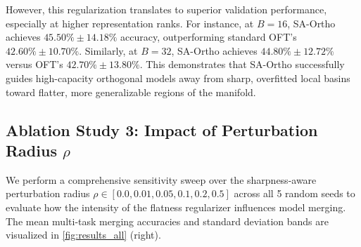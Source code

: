 \documentclass{article}
\theoremstyle{plain}
\theoremstyle{definition}
\theoremstyle{remark}
\begin{document}
However, this regularization translates to superior validation performance, especially at higher representation ranks. For instance, at $B=16$, SA-Ortho achieves $45.50\% \pm 14.18\%$ accuracy, outperforming standard OFT's $42.60\% \pm 10.70\%$. Similarly, at $B=32$, SA-Ortho achieves $44.80\% \pm 12.72\%$ versus OFT's $42.70\% \pm 13.80\%$. This demonstrates that SA-Ortho successfully guides high-capacity orthogonal models away from sharp, overfitted local basins toward flatter, more generalizable regions of the manifold.

\begin{table}[t]
  \caption{Comparative analysis of block size $B$ on Task 1 downstream adaptation across 5 random seeds. We report the mean final training loss and validation accuracy (Mean $\pm$ Std) for both standard Orthogonal Fine-Tuning (OFT) and our Sharpness-Aware Orthogonal (SA-Ortho) method.}
  \label{tab:block_size}
  \centering
\end{table}
\vspace{-12pt}

\subsection{Ablation Study 3: Impact of Perturbation Radius $\rho$}
We perform a comprehensive sensitivity sweep over the sharpness-aware perturbation radius $\rho \in [0.0, 0.01, 0.05, 0.1, 0.2, 0.5]$ across all 5 random seeds to evaluate how the intensity of the flatness regularizer influences model merging. The mean multi-task merging accuracies and standard deviation bands are visualized in \cref{fig:results_all} (right).
\end{document}
